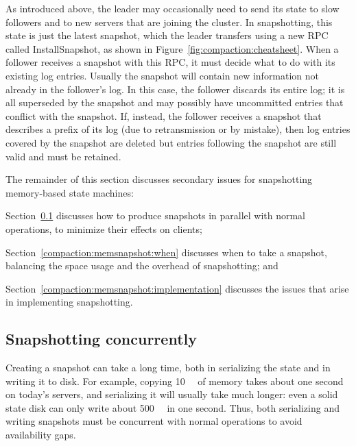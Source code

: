As introduced above, the leader may occasionally need to send its state
to slow followers and to new servers that are joining the cluster. In
snapshotting, this state is just the latest snapshot, which the leader
transfers using a new RPC called InstallSnapshot, as shown in
Figure~\ref{fig:compaction:cheatsheet}.
When a follower receives a snapshot with this RPC, it must decide
what to do with its existing log entries.
Usually the snapshot will
contain new information not already in the follower's log.
In this case, the follower discards its entire log; it is all
superseded by the snapshot and may possibly have uncommitted entries
that conflict with the snapshot. If, instead, the follower receives a
snapshot that describes a prefix of its log (due to retransmission or by
mistake), then log entries covered by the snapshot are deleted but
entries following the snapshot are still valid and must be retained.

The remainder of this section discusses secondary issues for
snapshotting memory-based state machines:
%
\begin{compactitem}
%
\item Section~\ref{compaction:memsnapshot:concurrent} discusses how to
produce snapshots in parallel with normal operations, to minimize their
effects on clients;
%
\item Section~\ref{compaction:memsnapshot:when} discusses when to take a
snapshot, balancing the space usage and the overhead of snapshotting; and
%
\item Section~\ref{compaction:memsnapshot:implementation} discusses the
issues that arise in implementing snapshotting.
%
\end{compactitem}

\subsection{Snapshotting concurrently}
\label{compaction:memsnapshot:concurrent}

Creating a snapshot can take a long time, both in serializing
the state and in writing it to disk. For example, copying
\SI{10}{\giga\byte} of
memory takes about one second on today's servers, and serializing it
will usually take much longer: even a solid state disk
can only write about \SI{500}{\mega\byte} in one second.
Thus, both serializing and
writing snapshots must be concurrent with normal operations to avoid
availability gaps.

